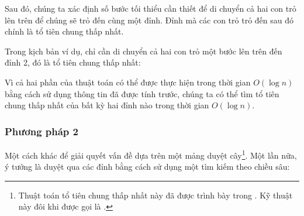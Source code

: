 Sau đó, chúng ta xác định số bước tối thiểu cần thiết
để di chuyển cả hai con trỏ lên trên để
chúng sẽ trỏ đến cùng một đỉnh.
Đỉnh mà các con trỏ trỏ đến sau đó
chính là tổ tiên chung thấp nhất.

Trong kịch bản ví dụ, chỉ cần di chuyển cả hai con trỏ
một bước lên trên đến đỉnh 2,
đó là tổ tiên chung thấp nhất:

\begin{center}
\end{center}

Vì cả hai phần của thuật toán có thể được thực hiện trong
thời gian $O(\log n)$ bằng cách sử dụng thông tin đã được tính trước,
chúng ta có thể tìm tổ tiên chung thấp nhất của bất kỳ hai
đỉnh nào trong thời gian $O(\log n)$.

\subsubsection{Phương pháp 2}


Một cách khác để giải quyết vấn đề dựa trên
một mảng duyệt cây\footnote{Thuật toán tổ tiên chung thấp nhất này đã được trình bày trong \cite{ben00}.
Kỹ thuật này đôi khi được gọi là  \cite{tar84}.}.
Một lần nữa, ý tưởng là duyệt qua các đỉnh
bằng cách sử dụng một tìm kiếm theo chiều sâu:

